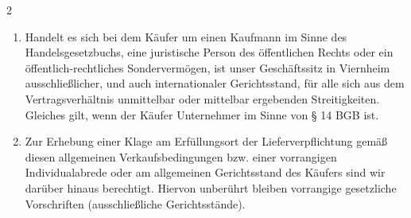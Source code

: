 \documentclass[%
    a4paper,%
    10pt,
]{scrartcl}
\begin{document}
\begin{multicols}{2}
\begin{enumerate}
\begin{enumerate}
              \item Handelt es sich bei dem Käufer um einen Kaufmann im Sinne des Handelsgesetzbuchs, eine juristische Person des öffentlichen Rechts oder ein öffentlich-rechtliches Sondervermögen, ist unser Geschäftssitz in Viernheim ausschließlicher, und auch internationaler Gerichtsstand, für alle sich aus dem Vertragsverhältnis unmittelbar oder mittelbar ergebenden Streitigkeiten. Gleiches gilt, wenn der Käufer Unternehmer im Sinne von § 14 BGB ist.
              \item Zur Erhebung einer Klage am Erfüllungsort der Lieferverpflichtung gemäß diesen allgemeinen Verkaufsbedingungen bzw. einer vorrangigen Individualabrede oder am allgemeinen Gerichtsstand des Käufers sind wir darüber hinaus berechtigt. Hiervon unberührt bleiben vorrangige gesetzliche Vorschriften (ausschließliche Gerichtsstände).
            \end{enumerate}
    \end{enumerate}
  \end{multicols}
\end{document}
